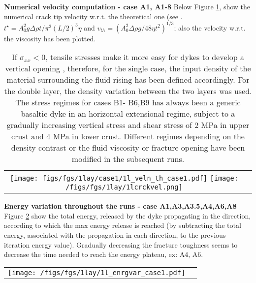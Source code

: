 \documentclass[9pt]{beamer}
\newcommand\Fontvi{\fontsize{6}{7.2}\selectfont}
\begin{document}
\begin{frame}{\textbf{Numerical velocity computation - case A1, A1-8}}
Below Figure \ref{fig:1}, show the numerical crack tip velocity w.r.t. the theoretical one (see \cite{turcotte1990}. $t^{\star}=A_0^2 g \Delta \rho t / \pi^2 (L/2)^3 \eta$ and $v_{th}=(A_0^2 \Delta \rho g/48 \eta t^2)^{1/3}$; also the velocity w.r.t. the viscosity has been plotted.
\begin{table}
    \centering
    \begin{tabular}{cc}
            \texttt{[image: figs/fgs/1lay/case1/1l\_veln\_th\_case1.pdf]}
        \texttt{[image: /figs/fgs/1lay/1lcrckvel.png]}
    \end{tabular}
    \label{fig:1}
  \caption{If $\sigma_{xx}<0$, tensile stresses make it more easy for dykes to develop a vertical opening \colorbox{yellow}{\cite{furst2024}}, therefore, for the single case, the input density of the material surrounding the fluid rising has been defined accordingly. For the double layer, the density variation between the two layers was used.
The stress regimes for cases B1- B6,B9 has always been a generic basaltic dyke in an horizontal extensional regime, subject to a gradually increasing vertical stress and shear stress of 2 MPa in upper crust and 4 MPa in lower crust. Different regimes depending on the density contrast or the fluid viscosity or fracture opening have been modified in the subsequent runs.}
\end{table}
\end{frame}

\begin{frame}{\textbf{Energy variation throughout the runs - case A1,A3,A3.5,A4,A6,A8}}
\Fontvi
Figure \ref{fig:2} show the total energy, released by the dyke propagating in the direction, according to which the max energy release is reached (by subtracting the total energy, associated with the propagation in each direction, to the previous iteration energy value). Gradually decreasing the fracture toughness seems to decrease the time needed to reach the energy plateau, ex: A4, A6.
\begin{table}
    \centering
    \begin{tabular}{cc}
        \texttt{[image: /figs/fgs/1lay/1l\_enrgvar\_case1.pdf]}
    \end{tabular}
    \label{fig:2}
\end{table}
\end{frame}
\end{document}
